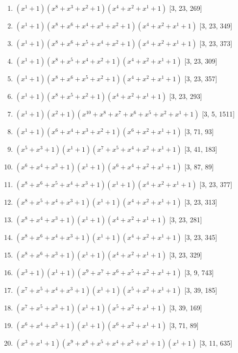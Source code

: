 \documentclass[10pt,twocolumn]{article}
\begin{document}
\begin{enumerate}
\item $(x^{1} + 1)(x^{8} + x^{3} + x^{2} + 1)(x^{4} + x^{2} + x^{1} + 1)$  [3, 23, 269]
\item $(x^{1} + 1)(x^{8} + x^{6} + x^{4} + x^{3} + x^{2} + 1)(x^{4} + x^{2} + x^{1} + 1)$  [3, 23, 349]
\item $(x^{1} + 1)(x^{8} + x^{6} + x^{5} + x^{4} + x^{2} + 1)(x^{4} + x^{2} + x^{1} + 1)$  [3, 23, 373]
\item $(x^{1} + 1)(x^{8} + x^{5} + x^{4} + x^{2} + 1)(x^{4} + x^{2} + x^{1} + 1)$  [3, 23, 309]
\item $(x^{1} + 1)(x^{8} + x^{6} + x^{5} + x^{2} + 1)(x^{4} + x^{2} + x^{1} + 1)$  [3, 23, 357]
\item $(x^{1} + 1)(x^{8} + x^{5} + x^{2} + 1)(x^{4} + x^{2} + x^{1} + 1)$  [3, 23, 293]
\item $(x^{1} + 1)(x^{2} + 1)(x^{10} + x^{8} + x^{7} + x^{6} + x^{5} + x^{2} + x^{1} + 1)$  [3, 5, 1511]
\item $(x^{1} + 1)(x^{6} + x^{4} + x^{3} + x^{2} + 1)(x^{6} + x^{2} + x^{1} + 1)$  [3, 71, 93]
\item $(x^{5} + x^{3} + 1)(x^{1} + 1)(x^{7} + x^{5} + x^{4} + x^{2} + x^{1} + 1)$  [3, 41, 183]
\item $(x^{6} + x^{4} + x^{3} + 1)(x^{1} + 1)(x^{6} + x^{4} + x^{2} + x^{1} + 1)$  [3, 87, 89]
\item $(x^{8} + x^{6} + x^{5} + x^{4} + x^{3} + 1)(x^{1} + 1)(x^{4} + x^{2} + x^{1} + 1)$  [3, 23, 377]
\item $(x^{8} + x^{5} + x^{4} + x^{3} + 1)(x^{1} + 1)(x^{4} + x^{2} + x^{1} + 1)$  [3, 23, 313]
\item $(x^{8} + x^{4} + x^{3} + 1)(x^{1} + 1)(x^{4} + x^{2} + x^{1} + 1)$  [3, 23, 281]
\item $(x^{8} + x^{6} + x^{4} + x^{3} + 1)(x^{1} + 1)(x^{4} + x^{2} + x^{1} + 1)$  [3, 23, 345]
\item $(x^{8} + x^{6} + x^{3} + 1)(x^{1} + 1)(x^{4} + x^{2} + x^{1} + 1)$  [3, 23, 329]
\item $(x^{3} + 1)(x^{1} + 1)(x^{9} + x^{7} + x^{6} + x^{5} + x^{2} + x^{1} + 1)$  [3, 9, 743]
\item $(x^{7} + x^{5} + x^{4} + x^{3} + 1)(x^{1} + 1)(x^{5} + x^{2} + x^{1} + 1)$  [3, 39, 185]
\item $(x^{7} + x^{5} + x^{3} + 1)(x^{1} + 1)(x^{5} + x^{2} + x^{1} + 1)$  [3, 39, 169]
\item $(x^{6} + x^{4} + x^{3} + 1)(x^{1} + 1)(x^{6} + x^{2} + x^{1} + 1)$  [3, 71, 89]
\item $(x^{3} + x^{1} + 1)(x^{9} + x^{6} + x^{5} + x^{4} + x^{3} + x^{1} + 1)(x^{1} + 1)$  [3, 11, 635]

\end{enumerate}
\end{document}
